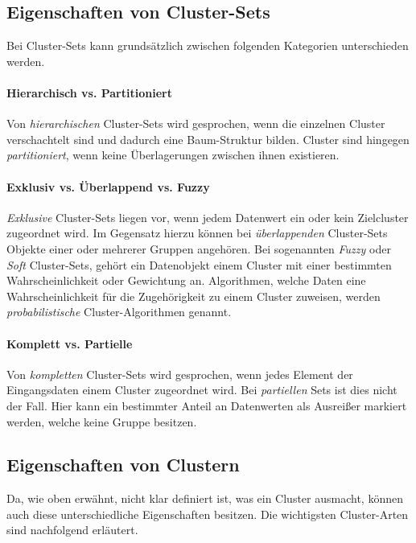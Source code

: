 \subsection{Eigenschaften von Cluster-Sets}

Bei Cluster-Sets kann grundsätzlich zwischen folgenden Kategorien unterschieden werden.

\paragraph{Hierarchisch vs. Partitioniert}
Von \textit{hierarchischen} Cluster-Sets wird gesprochen, wenn die einzelnen Cluster verschachtelt sind und dadurch eine
Baum-Struktur bilden. Cluster sind hingegen \textit{partitioniert}, wenn keine Überlagerungen zwischen ihnen existieren.

\paragraph{Exklusiv vs. Überlappend vs. Fuzzy}
\textit{Exklusive} Cluster-Sets liegen vor, wenn jedem Datenwert ein oder kein Zielcluster zugeordnet wird.
Im Gegensatz hierzu können bei \textit{überlappenden} Cluster-Sets Objekte einer oder mehrerer Gruppen angehören.
Bei sogenannten \textit{Fuzzy} oder \textit{Soft} Cluster-Sets, gehört ein Datenobjekt einem Cluster
mit einer bestimmten Wahrscheinlichkeit oder Gewichtung an. Algorithmen, welche Daten eine
Wahrscheinlichkeit für die Zugehörigkeit zu einem Cluster zuweisen, werden \textit{probabilistische}
Cluster-Algorithmen genannt.

\paragraph{Komplett vs. Partielle}
Von \textit{kompletten} Cluster-Sets wird gesprochen, wenn jedes Element der Eingangsdaten einem Cluster zugeordnet wird.
Bei \textit{partiellen} Sets ist dies nicht der Fall. Hier kann ein bestimmter Anteil an Datenwerten als Ausreißer markiert
werden, welche keine Gruppe besitzen.

\subsection{Eigenschaften von Clustern}

Da, wie oben erwähnt, nicht klar definiert ist, was ein Cluster ausmacht, können auch diese unterschiedliche Eigenschaften
besitzen. Die wichtigsten Cluster-Arten sind nachfolgend erläutert.

